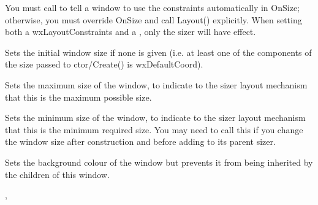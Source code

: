 

You must call  to tell a window to use
the constraints automatically in OnSize; otherwise, you must override OnSize and call Layout()
explicitly. When setting both a wxLayoutConstraints and a , only the
sizer will have effect.

\label{wxwindowsetinitialbestsize}


Sets the initial window size if none is given (i.e. at least one of the
components of the size passed to ctor/Create() is wxDefaultCoord).

\label{wxwindowsetmaxsize}


Sets the maximum size of the window, to indicate to the sizer layout mechanism
that this is the maximum possible size.

\label{wxwindowsetminsize}


Sets the minimum size of the window, to indicate to the sizer layout mechanism
that this is the minimum required size. You may need to call this
if you change the window size after construction and before adding
to its parent sizer.

\label{wxwindowsetownbackgroundcolour}


Sets the background colour of the window but prevents it from being inherited
by the children of this window.


,\rtfsp
{}


\label{wxwindowsetownfont}


